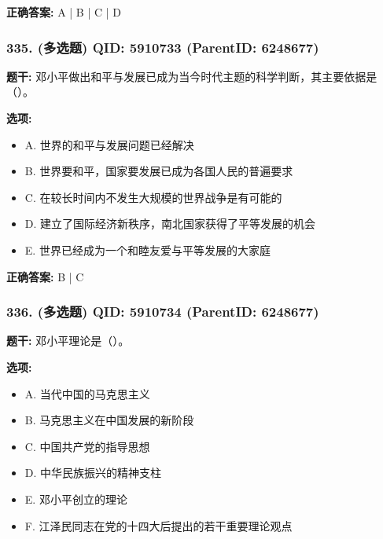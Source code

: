 \documentclass[12pt,UTF8]{ctexart}
\begin{document}
\textbf{正确答案:}
A | B | C | D

\vspace{0.3em}\hrulefill\vspace{0.7em}

\subsubsection*{335. (多选题) \small QID: 5910733 (ParentID: 6248677)}

\textbf{题干:}
邓小平做出和平与发展已成为当今时代主题的科学判断，其主要依据是（）。



\textbf{选项:}
\begin{itemize}[leftmargin=*]

  \item A. 世界的和平与发展问题已经解决

  \item B. 世界要和平，国家要发展已成为各国人民的普遍要求

  \item C. 在较长时间内不发生大规模的世界战争是有可能的

  \item D. 建立了国际经济新秩序，南北国家获得了平等发展的机会

  \item E. 世界已经成为一个和睦友爱与平等发展的大家庭

\end{itemize}

\textbf{正确答案:}
B | C

\vspace{0.3em}\hrulefill\vspace{0.7em}

\subsubsection*{336. (多选题) \small QID: 5910734 (ParentID: 6248677)}

\textbf{题干:}
邓小平理论是（）。



\textbf{选项:}
\begin{itemize}[leftmargin=*]

  \item A. 当代中国的马克思主义

  \item B. 马克思主义在中国发展的新阶段

  \item C. 中国共产党的指导思想

  \item D. 中华民族振兴的精神支柱

  \item E. 邓小平创立的理论

  \item F. 江泽民同志在党的十四大后提出的若干重要理论观点

\end{itemize}
\end{document}
